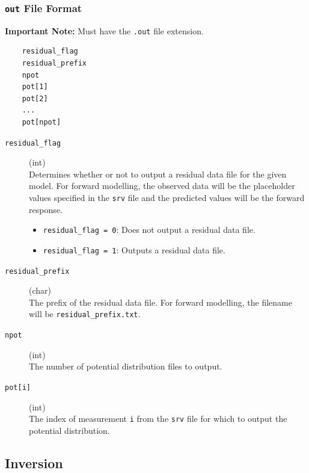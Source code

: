 \documentclass[a4paper,12pt]{article}
\begin{document}
\subsubsection{\texttt{out} File Format} \label{forward_out}

\begin{framed}
\noindent \textbf{Important Note:} Must have the \texttt{.out} file extension.
\end{framed}

\begin{framed}
\begin{verbatim}
    residual_flag
    residual_prefix
    npot
    pot[1]
    pot[2]
    ...
    pot[npot]
\end{verbatim}
\end{framed}

\begin{description}
    \item[\texttt{residual\_flag}] (int)\hfill \\
    Determines whether or not to output a residual data file for the given model. For forward modelling, the observed data will be the placeholder values specified in the \texttt{srv} file and the predicted values will be the forward response.
    \begin{itemize}
        \item \texttt{residual\_flag = 0}: Does not output a residual data file.
        \item \texttt{residual\_flag = 1}: Outputs a residual data file.
    \end{itemize}
    
    \item[\texttt{residual\_prefix}] (char)\hfill \\
    The prefix of the residual data file. For forward modelling, the filename will be \texttt{residual\_prefix.txt}.
    
    \item[\texttt{npot}] (int)\hfill \\
    The number of potential distribution files to output.

    \item[\texttt{pot[i]}] (int)\hfill \\
    The index of measurement \texttt{i} from the \texttt{srv} file for which to output the potential distribution.
\end{description}



\subsection{Inversion}
\end{document}
